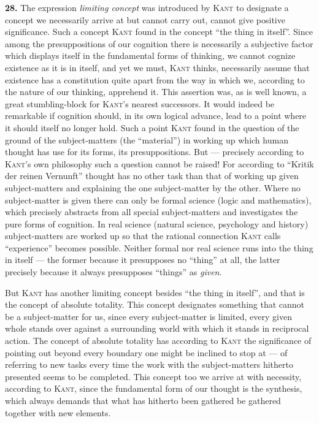 \documentclass[12pt]{book}
\newcommand{\hnum}[1]{\textbf{#1.}\enspace}
\newcommand{\opage}[1]{\marginnote{\footnotesize\textit{[#1]}}}
\begin{document}
\opage{74}\hnum{28} The expression \emph{limiting concept} was introduced by \textsc{Kant} to
designate a concept we necessarily arrive at but cannot carry out, cannot give positive
significance. Such a concept \textsc{Kant} found in the concept ``the thing in itself''.
Since among the presuppositions of our cognition there is necessarily a subjective factor
which displays itself in the fundamental forms of thinking, we cannot cognize existence
as it is in itself, and yet we must, \textsc{Kant} thinks, necessarily assume that
existence has a constitution quite apart from the way in which we, according to the
nature of our thinking, apprehend it. This assertion was, as is well known, a great
stumbling-block for \textsc{Kant}'s nearest successors. It would indeed be remarkable if
cognition should, in its own logical advance, lead to a point where it should itself no
longer hold. Such a point \textsc{Kant} found in the question of the ground of the
subject-matters (the ``material'') in working up which human thought has use for its
forms, its presuppositions. But --- precisely according to \textsc{Kant}'s own philosophy
such a question cannot be raised! For according to ``Kritik der reinen Vernunft'' thought
has no other task than that of working up given subject-matters and explaining the one
subject-matter by the other. Where no subject-matter is given there can only be formal
science (logic and mathematics), which precisely abstracts from all special
subject-matters and investigates the pure forms of cognition. In real science (natural
science, psychology and history) subject-matters are worked up so that the rational
connection \textsc{Kant} calls ``experience'' becomes possible. Neither formal nor real
science runs into the thing in itself --- the former because it presupposes no ``thing''
at all, the latter precisely because it always presupposes ``things'' as \textit{given}.

But \textsc{Kant} has another limiting concept besides ``the thing in itself'', and that
is the concept of absolute totality. This concept designates something that cannot be a
subject-matter for us, since every subject-matter is limited, every given whole stands
over against a surrounding world with which it stands in reciprocal action. The concept
of absolute totality has according to \textsc{Kant} the significance of pointing out
beyond every boundary one might be inclined to stop at --- of referring to new tasks
every time the work with the subject-matters hitherto presented seems to be completed.
This concept too we arrive at with necessity, according to \textsc{Kant}, since the
fundamental form of our thought is the synthesis, which always demands that what has
hitherto been gathered be gathered together with new elements.
\end{document}
